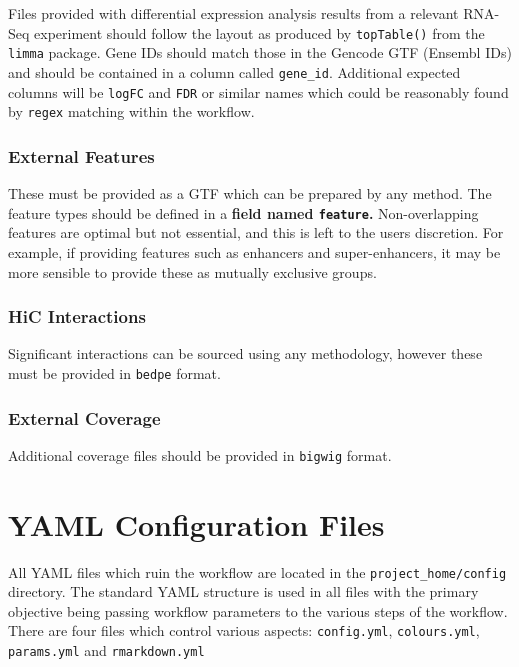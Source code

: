 \documentclass[
]{book}
\begin{document}
Files provided with differential expression analysis results from a relevant RNA-Seq experiment should follow the layout as produced by \texttt{topTable()} from the \texttt{limma} package\citep{limma}.
Gene IDs should match those in the Gencode GTF (Ensembl IDs) and should be contained in a column called \texttt{gene\_id}.
Additional expected columns will be \texttt{logFC} and \texttt{FDR} or similar names which could be reasonably found by \texttt{regex} matching within the workflow.

\hypertarget{external-features}{%
\subsection{External Features}\label{external-features}}

These must be provided as a GTF which can be prepared by any method.
The feature types should be defined in a \textbf{field named \texttt{feature}.}
Non-overlapping features are optimal but not essential, and this is left to the users discretion.
For example, if providing features such as enhancers and super-enhancers\citep{rose}, it may be more sensible to provide these as mutually exclusive groups.

\hypertarget{hic-interactions}{%
\subsection{HiC Interactions}\label{hic-interactions}}

Significant interactions can be sourced using any methodology, however these must be provided in \texttt{bedpe} format.

\hypertarget{external-coverage}{%
\subsection{External Coverage}\label{external-coverage}}

Additional coverage files should be provided in \texttt{bigwig} format.

\hypertarget{editing-yaml}{%
\chapter{YAML Configuration Files}\label{editing-yaml}}

All YAML files which ruin the workflow are located in the \texttt{project\_home/config} directory.
The standard YAML structure is used in all files with the primary objective being passing workflow parameters to the various steps of the workflow.
There are four files which control various aspects: \texttt{config.yml}, \texttt{colours.yml}, \texttt{params.yml} and \texttt{rmarkdown.yml}
\end{document}
